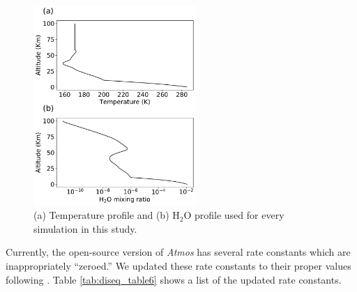 \begin{figure}
  \centering
  \includegraphics[width=0.55\textwidth]{tex/2diseq/Figure6.pdf}
  \caption{(a) Temperature profile and (b) H$_2$O profile used for every simulation in this study.}
  \label{fig:diseq_figure6}
\end{figure}

Currently, the open-source version of \textit{Atmos} has several rate constants which are inappropriately ``zeroed.'' We updated these rate constants to their proper values following \citet{Harman_2015}. Table \ref{tab:diseq_table6} shows a list of the updated rate constants.

